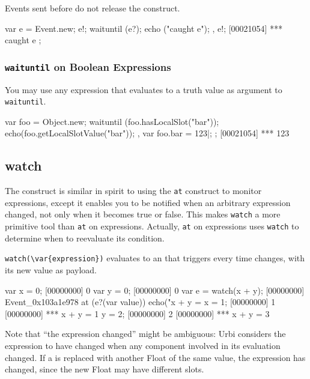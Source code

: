 Events sent before do not release the construct.

\begin{urbiscript}
{
  var e = Event.new;
  e!;
  {
    waituntil (e?);
    echo ("caught e");
  },
  e!;
[00021054] *** caught e
};
\end{urbiscript}

\subsubsection{\lstinline'waituntil' on Boolean Expressions}

You may use any expression that evaluates to a truth value as argument
to \lstinline'waituntil'.

\begin{urbiscript}
{
  var foo = Object.new;
  {
    waituntil (foo.hasLocalSlot("bar"));
    echo(foo.getLocalSlotValue("bar"));
  },
  var foo.bar = 123|;
};
[00021054] *** 123
\end{urbiscript}

\subsection{watch}
\label{sec:lang:watch}


The  construct is similar in spirit to using the
\lstinline|at| construct to monitor expressions, except it enables you to be
notified when an arbitrary expression changed, not only when it becomes true
or false. This makes \lstinline|watch| a more primitive tool than
\lstinline|at| on expressions.  Actually, \lstinline|at| on expressions uses
\lstinline|watch| to determine when to reevaluate its condition.

\lstinline|watch(\var{expression})| evaluates to an  that
triggers every time  changes, with its new value as payload.

\begin{urbiscript}[firstnumber=1]
var x = 0;
[00000000] 0
var y = 0;
[00000000] 0
var e = watch(x + y);
[00000000] Event_0x103a1e978
at (e?(var value))
  echo("x + y = %
x = 1;
[00000000] 1
[00000000] *** x + y = 1
y = 2;
[00000000] 2
[00000000] *** x + y = 3
\end{urbiscript}

Note that ``the expression changed'' might be ambiguous: Urbi considers the
expression to have changed when any component involved in its evaluation
changed.  If a  is replaced with another Float of the same
value, the expression has changed, since the new Float may have different
slots.

